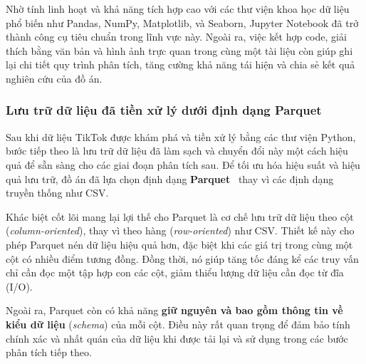 Nhờ tính linh hoạt và khả năng tích hợp cao với các thư viện khoa học dữ liệu phổ biến như Pandas, NumPy, Matplotlib, và Seaborn, Jupyter Notebook đã trở thành công cụ tiêu chuẩn trong lĩnh vực này. Ngoài ra, việc kết hợp code, giải thích bằng văn bản và hình ảnh trực quan trong cùng một tài liệu còn giúp ghi lại chi tiết quy trình phân tích, tăng cường khả năng tái hiện và chia sẻ kết quả nghiên cứu của đồ án.

\subsubsection{Lưu trữ dữ liệu đã tiền xử lý dưới định dạng Parquet}

Sau khi dữ liệu TikTok được khám phá và tiền xử lý bằng các thư viện Python, bước tiếp theo là lưu trữ dữ liệu đã làm sạch và chuyển đổi này một cách hiệu quả để sẵn sàng cho các giai đoạn phân tích sau. Để tối ưu hóa hiệu suất và hiệu quả lưu trữ, đồ án đã lựa chọn định dạng \textbf{Parquet}~\cite{parquet} thay vì các định dạng truyền thống như CSV.

Khác biệt cốt lõi mang lại lợi thế cho Parquet là cơ chế lưu trữ dữ liệu theo cột (\textit{column-oriented}), thay vì theo hàng (\textit{row-oriented}) như CSV. Thiết kế này cho phép Parquet nén dữ liệu hiệu quả hơn, đặc biệt khi các giá trị trong cùng một cột có nhiều điểm tương đồng. Đồng thời, nó giúp tăng tốc đáng kể các truy vấn chỉ cần đọc một tập hợp con các cột, giảm thiểu lượng dữ liệu cần đọc từ đĩa (I/O).

Ngoài ra, Parquet còn có khả năng \textbf{giữ nguyên và bao gồm thông tin về kiểu dữ liệu} (\textit{schema}) của mỗi cột. Điều này rất quan trọng để đảm bảo tính chính xác và nhất quán của dữ liệu khi được tải lại và sử dụng trong các bước phân tích tiếp theo.

